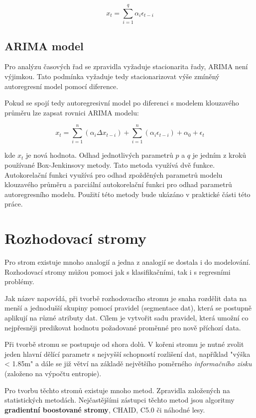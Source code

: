 \documentclass[FM,BP,fonts]{tulthesis}
\begin{document}
\begin{equation}
	x_t =  \sum_{i=1}^{q}\alpha_i\epsilon_{t-i}
\end{equation}


\subsection{ARIMA model}
Pro analýzu časových řad se zpravidla vyžaduje stacionarita řady, ARIMA není výjimkou. Tato podmínka vyžaduje tedy stacionarizovat výše zmíněný autoregresní model pomocí diference. 

Pokud se spojí tedy autoregresivní model po diferenci s modelem klouzavého průměru lze zapsat rovnici ARIMA modelu: 

\begin{equation}
 x_t =    \sum_{i=1}^{n}(\alpha_i \Delta x_{t-i}) + \sum_{i=1}^{n}(\alpha_i\epsilon_{t-i}) + \alpha_0 + \epsilon_t
\end{equation}

kde $x_t$ je nová hodnota. Odhad jednotlivých parametrů $p$ a $q$ je jedním z kroků používané Box-Jenkinsovy metody. \cite{zayiong} Tato metoda využívá dvě funkce. Autokorelační funkci využívá pro odhad zpožděných parametrů modelu klouzavého průměru a parciální autokorelační funkci pro odhad parametrů autoregresního modelu. Použití této metody bude ukázáno v praktické části této práce.


\section{Rozhodovací stromy}
Pro strom existuje mnoho analogií a jedna z analogií se dostala i do modelování. Rozhodovací stromy můžou pomoci jak s klasifikačními, tak i s regresními problémy. 

Jak název napovídá, při tvorbě rozhodovacího stromu je snaha rozdělit data na menší a jednodušší skupiny pomocí pravidel (segmentace dat), která se postupně aplikují na různé atributy dat. Cílem je vytvořit sadu pravidel, která umožní co nejpřesněji predikovat hodnotu požadované proměnné pro nově příchozí data.

Při tvorbě stromu se postupuje od shora dolů. V kořeni stromu je nutné zvolit jeden hlavní dělící parametr s nejvyšší schopností rozlišení dat, například "výška < 1.85m" a dále se již větví na základě největšího poměrného \textit{informačního zisku} (založeno na výpočtu entropie).  \cite{Tomsik2016thesis}

Pro tvorbu těchto stromů existuje mnoho metod. Zpravidla založených na statistických metodách. Nejčastějšími zástupci těchto metod jsou algoritmy \textbf{gradientní boostované stromy}, CHAID, C5.0 či náhodné lesy. \cite{Tomsik2016thesis}
\end{document}
